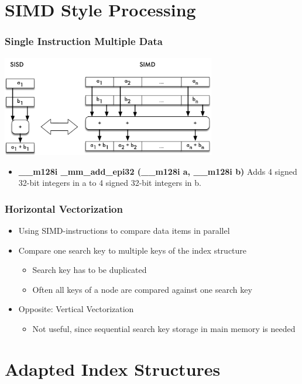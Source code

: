 \documentclass{beamer}
\begin{document}
\section{SIMD Style Processing}
\begin{frame}
\frametitle{Single Instruction Multiple Data}
\begin{center}
	\includegraphics[width=0.7\textwidth]{img/simd.pdf}
\end{center}
\begin{itemize}
	\item \textbf{\_\_m128i \_mm\_add\_epi32 (\_\_m128i a, \_\_m128i b)} Adds  4 signed 32-bit integers in a to 4 signed 32-bit integers
	in b.
\end{itemize}
\end{frame}
\begin{frame}
\frametitle{Horizontal Vectorization}
\begin{itemize}
	\item Using SIMD-instructions to compare data items in parallel
	\item Compare one search key to multiple keys of the index structure
	\begin{itemize}
		\item Search key has to be duplicated
		\item Often all keys of a node are compared against one search key
	\end{itemize}
	\vspace*{0.5cm}
	\item Opposite: Vertical Vectorization
	\begin{itemize}
		\item Not useful, since sequential search key storage in main memory is needed
	\end{itemize}
\end{itemize}
\end{frame}
\section{Adapted Index Structures}
\end{document}
